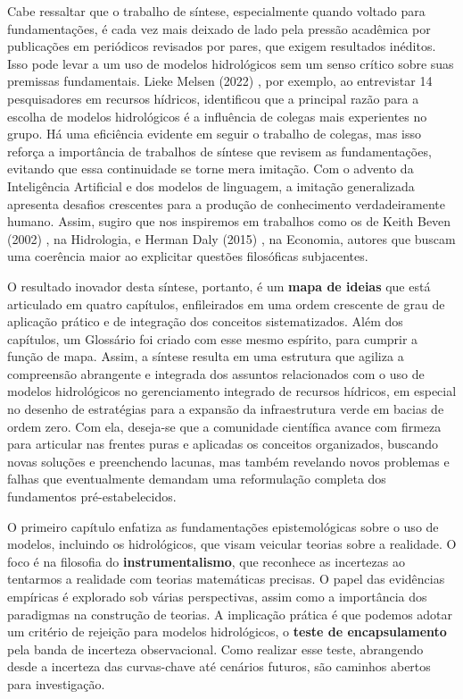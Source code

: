 \documentclass[./main.tex]{subfiles}
\begin{document}
\par Cabe ressaltar que o trabalho de síntese, especialmente quando voltado para fundamentações, é cada vez mais deixado de lado pela pressão acadêmica por publicações em periódicos revisados por pares, que exigem resultados inéditos. Isso pode levar a um uso de modelos hidrológicos sem um senso crítico sobre suas premissas fundamentais. Lieke Melsen (2022) \cite{Melsen2022}, por exemplo, ao entrevistar 14 pesquisadores em recursos hídricos, identificou que a principal razão para a escolha de modelos hidrológicos é a influência de colegas mais experientes no grupo. Há uma eficiência evidente em seguir o trabalho de colegas, mas isso reforça a importância de trabalhos de síntese que revisem as fundamentações, evitando que essa continuidade se torne mera imitação. Com o advento da Inteligência Artificial e dos modelos de linguagem, a imitação generalizada apresenta desafios crescentes para a produção de conhecimento verdadeiramente humano. Assim, sugiro que nos inspiremos em trabalhos como os de Keith Beven (2002) \cite{Beven2002a}, na Hidrologia, e Herman Daly (2015) \cite{Daly2015a}, na Economia, autores que buscam uma coerência maior ao explicitar questões filosóficas subjacentes.

\par O resultado inovador desta síntese, portanto, é um \textbf{mapa de ideias} que está articulado em quatro capítulos, enfileirados em uma ordem crescente de grau de aplicação prático e de integração dos conceitos sistematizados. Além dos capítulos, um Glossário foi criado com esse mesmo espírito, para cumprir a função de mapa. Assim, a síntese resulta em uma estrutura que agiliza a compreensão abrangente e integrada dos assuntos relacionados com o uso de modelos hidrológicos no gerenciamento integrado de recursos hídricos, em especial no desenho de estratégias para a expansão da infraestrutura verde em bacias de ordem zero. Com ela, deseja-se que a comunidade científica avance com firmeza para articular nas frentes puras e aplicadas os conceitos organizados, buscando novas soluções e preenchendo lacunas, mas também revelando novos problemas e falhas que eventualmente demandam uma reformulação completa dos fundamentos pré-estabelecidos.

\par O primeiro capítulo enfatiza as fundamentações epistemológicas sobre o uso de modelos, incluindo os hidrológicos, que visam veicular teorias sobre a realidade. O foco é na filosofia do \textbf{instrumentalismo}, que reconhece as incertezas ao tentarmos  a realidade com teorias matemáticas precisas. O papel das evidências empíricas é explorado sob várias perspectivas, assim como a importância dos paradigmas na construção de teorias. A implicação prática é que podemos adotar um critério de rejeição para modelos hidrológicos, o \textbf{teste de encapsulamento} pela banda de incerteza observacional. Como realizar esse teste, abrangendo desde a incerteza das curvas-chave até cenários futuros, são caminhos abertos para investigação.
\end{document}
